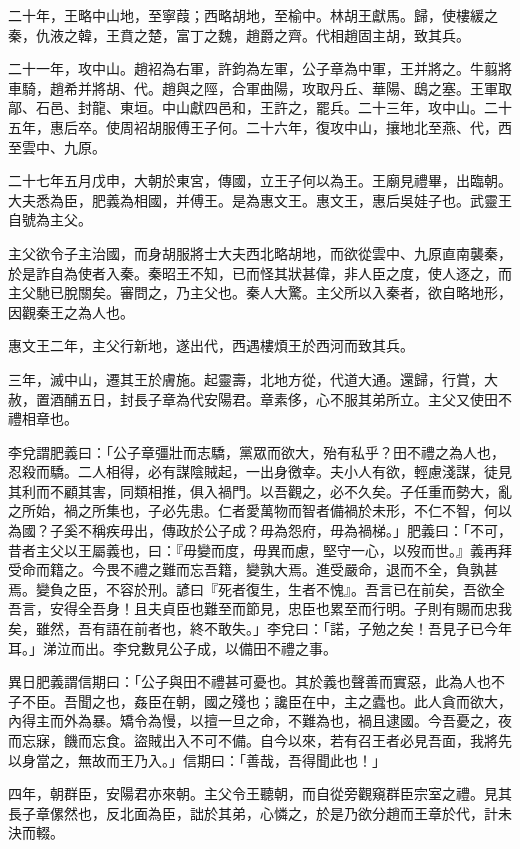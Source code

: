 \begin{pinyinscope}
二十年，王略中山地，至寧葭；西略胡地，至榆中。林胡王獻馬。歸，使樓緩之秦，仇液之韓，王賁之楚，富丁之魏，趙爵之齊。代相趙固主胡，致其兵。

二十一年，攻中山。趙袑為右軍，許鈞為左軍，公子章為中軍，王并將之。牛翦將車騎，趙希并將胡、代。趙與之陘，合軍曲陽，攻取丹丘、華陽、鴟之塞。王軍取鄗、石邑、封龍、東垣。中山獻四邑和，王許之，罷兵。二十三年，攻中山。二十五年，惠后卒。使周袑胡服傅王子何。二十六年，復攻中山，攘地北至燕、代，西至雲中、九原。

二十七年五月戊申，大朝於東宮，傳國，立王子何以為王。王廟見禮畢，出臨朝。大夫悉為臣，肥義為相國，并傅王。是為惠文王。惠文王，惠后吳娃子也。武靈王自號為主父。

主父欲令子主治國，而身胡服將士大夫西北略胡地，而欲從雲中、九原直南襲秦，於是詐自為使者入秦。秦昭王不知，已而怪其狀甚偉，非人臣之度，使人逐之，而主父馳已脫關矣。審問之，乃主父也。秦人大驚。主父所以入秦者，欲自略地形，因觀秦王之為人也。

惠文王二年，主父行新地，遂出代，西遇樓煩王於西河而致其兵。

三年，滅中山，遷其王於膚施。起靈壽，北地方從，代道大通。還歸，行賞，大赦，置酒酺五日，封長子章為代安陽君。章素侈，心不服其弟所立。主父又使田不禮相章也。

李兌謂肥義曰：「公子章彊壯而志驕，黨眾而欲大，殆有私乎？田不禮之為人也，忍殺而驕。二人相得，必有謀陰賊起，一出身徼幸。夫小人有欲，輕慮淺謀，徒見其利而不顧其害，同類相推，俱入禍門。以吾觀之，必不久矣。子任重而勢大，亂之所始，禍之所集也，子必先患。仁者愛萬物而智者備禍於未形，不仁不智，何以為國？子奚不稱疾毋出，傳政於公子成？毋為怨府，毋為禍梯。」肥義曰：「不可，昔者主父以王屬義也，曰：『毋變而度，毋異而慮，堅守一心，以歿而世。』義再拜受命而籍之。今畏不禮之難而忘吾籍，變孰大焉。進受嚴命，退而不全，負孰甚焉。變負之臣，不容於刑。諺曰『死者復生，生者不愧』。吾言已在前矣，吾欲全吾言，安得全吾身！且夫貞臣也難至而節見，忠臣也累至而行明。子則有賜而忠我矣，雖然，吾有語在前者也，終不敢失。」李兌曰：「諾，子勉之矣！吾見子已今年耳。」涕泣而出。李兌數見公子成，以備田不禮之事。

異日肥義謂信期曰：「公子與田不禮甚可憂也。其於義也聲善而實惡，此為人也不子不臣。吾聞之也，姦臣在朝，國之殘也；讒臣在中，主之蠹也。此人貪而欲大，內得主而外為暴。矯令為慢，以擅一旦之命，不難為也，禍且逮國。今吾憂之，夜而忘寐，饑而忘食。盜賊出入不可不備。自今以來，若有召王者必見吾面，我將先以身當之，無故而王乃入。」信期曰：「善哉，吾得聞此也！」

四年，朝群臣，安陽君亦來朝。主父令王聽朝，而自從旁觀窺群臣宗室之禮。見其長子章傫然也，反北面為臣，詘於其弟，心憐之，於是乃欲分趙而王章於代，計未決而輟。


\end{pinyinscope}
